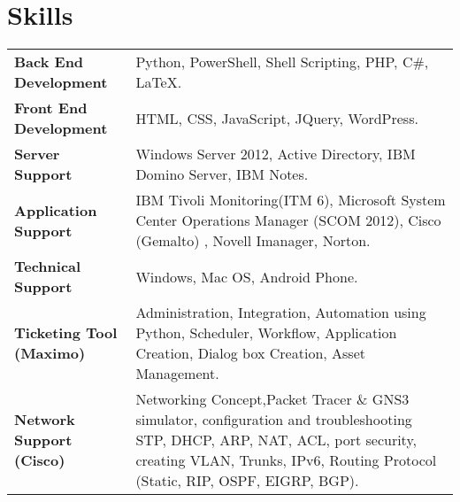 \documentclass[letterpaper, 12 pt]{article}
\begin{document}
			\section*{Skills}
			\begin{tabular}{m{} m{}} 
				\textbf{Back End Development} & Python, PowerShell, Shell Scripting, PHP, C\#, \LaTeX.  \\ 
				\textbf{Front End Development} & HTML, CSS, JavaScript, JQuery, WordPress. \\
				\textbf{Server Support} & Windows Server 2012, Active Directory, IBM Domino Server, IBM Notes. \\
				\textbf{Application Support} & IBM Tivoli Monitoring(ITM 6), Microsoft System Center Operations Manager (SCOM 2012), Cisco (Gemalto) , Novell Imanager, Norton. \\ 
				\textbf{Technical Support} & Windows, Mac OS, Android Phone. \\ 
				\textbf{Ticketing Tool (Maximo)} & Administration, Integration, Automation using Python, Scheduler, Workflow, Application Creation, Dialog box Creation, Asset Management. \\
				\textbf{Network Support (Cisco)} & Networking Concept,Packet Tracer \& GNS3 simulator, configuration and troubleshooting STP, DHCP, ARP, NAT, ACL, port security, creating VLAN,
				Trunks, IPv6, Routing Protocol (Static, RIP, OSPF, EIGRP, BGP).\\
			\end{tabular}		
\end{document}
